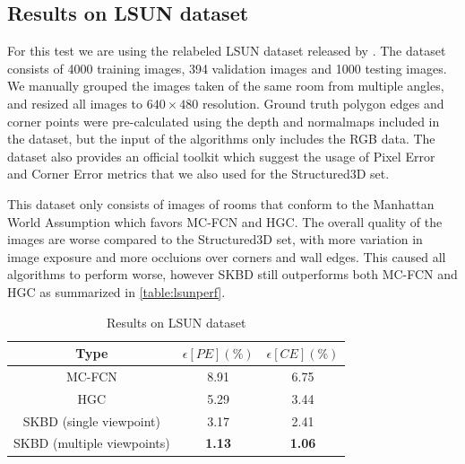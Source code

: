 \subsection{Results on LSUN dataset}
For this test we are using the relabeled LSUN dataset released by \cite{ren2017coarse}. The dataset consists of 4000 training images, 394 validation images and 1000 testing images. We manually grouped the images taken of the same room from multiple angles, and resized all images to \( 640 \times 480 \) resolution. Ground truth polygon edges and corner points were pre-calculated using the depth and normalmaps included in the dataset, but the input of the algorithms only includes the RGB data. The dataset also provides an official toolkit which suggest the usage of Pixel Error and Corner Error metrics that we also used for the Structured3D set.

This dataset only consists of images of rooms that conform to the Manhattan World Assumption\cite{790349} which favors MC-FCN and HGC. The overall quality of the images are worse compared to the Structured3D set, with more variation in image exposure and more occluions over corners and wall edges. This caused all algorithms to perform worse, however SKBD still outperforms both MC-FCN and HGC as summarized in \autoref{table:lsunperf}.

\begin{table}[H]
\centering
\begin{tabular}{|c | c c |}
    \hline
    Type & $\epsilon[PE](\%)$ & $\epsilon[CE](\%)$ \\ [0.5 ex]
    \hline\hline
    MC-FCN & 8.91 & 6.75 \\
    HGC & 5.29 & 3.44 \\
    SKBD (single viewpoint) & 3.17 & 2.41 \\
    \hline
    SKBD (multiple viewpoints) & \textbf{1.13} & \textbf{1.06} \\
    \hline
\end{tabular}
\caption{Results on LSUN dataset}
\label{table:lsunperf}
\end{table}



